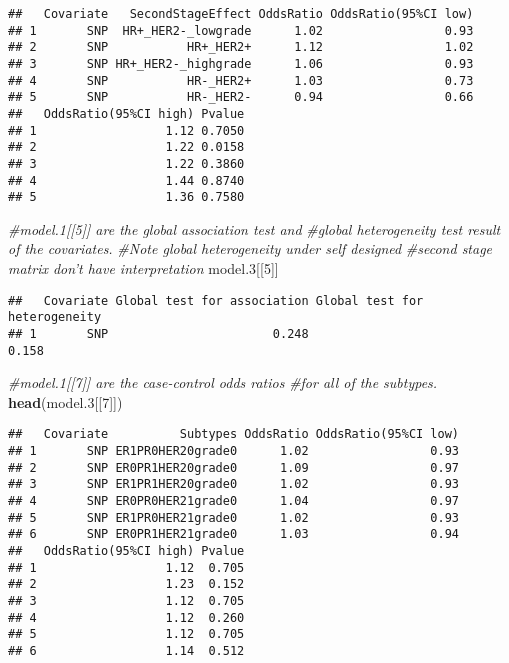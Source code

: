 \documentclass[11pt,]{article}
\newenvironment{Shaded}{\begin{snugshade}}{\end{snugshade}}
\newcommand{\CommentTok}[1]{\textcolor[rgb]{0.56,0.35,0.01}{\textit{#1}}}
\newcommand{\DecValTok}[1]{\textcolor[rgb]{0.00,0.00,0.81}{#1}}
\newcommand{\FloatTok}[1]{\textcolor[rgb]{0.00,0.00,0.81}{#1}}
\newcommand{\KeywordTok}[1]{\textcolor[rgb]{0.13,0.29,0.53}{\textbf{#1}}}
\newcommand{\NormalTok}[1]{#1}
\begin{document}
\begin{verbatim}
##   Covariate   SecondStageEffect OddsRatio OddsRatio(95%CI low)
## 1       SNP  HR+_HER2-_lowgrade      1.02                 0.93
## 2       SNP           HR+_HER2+      1.12                 1.02
## 3       SNP HR+_HER2-_highgrade      1.06                 0.93
## 4       SNP           HR-_HER2+      1.03                 0.73
## 5       SNP           HR-_HER2-      0.94                 0.66
##   OddsRatio(95%CI high) Pvalue
## 1                  1.12 0.7050
## 2                  1.22 0.0158
## 3                  1.22 0.3860
## 4                  1.44 0.8740
## 5                  1.36 0.7580
\end{verbatim}

\begin{Shaded}
\begin{Highlighting}[]
\CommentTok{#model.1[[5]] are the global association test and }
\CommentTok{#global heterogeneity test result of the covariates.}
\CommentTok{#Note global heterogeneity under self designed}
\CommentTok{#second stage matrix don't have interpretation}
\NormalTok{model}\FloatTok{.3}\NormalTok{[[}\DecValTok{5}\NormalTok{]]}
\end{Highlighting}
\end{Shaded}

\begin{verbatim}
##   Covariate Global test for association Global test for heterogeneity
## 1       SNP                       0.248                         0.158
\end{verbatim}

\begin{Shaded}
\begin{Highlighting}[]
\CommentTok{#model.1[[7]] are the case-control odds ratios }
\CommentTok{#for all of the subtypes.}
\KeywordTok{head}\NormalTok{(model}\FloatTok{.3}\NormalTok{[[}\DecValTok{7}\NormalTok{]])}
\end{Highlighting}
\end{Shaded}

\begin{verbatim}
##   Covariate          Subtypes OddsRatio OddsRatio(95%CI low)
## 1       SNP ER1PR0HER20grade0      1.02                 0.93
## 2       SNP ER0PR1HER20grade0      1.09                 0.97
## 3       SNP ER1PR1HER20grade0      1.02                 0.93
## 4       SNP ER0PR0HER21grade0      1.04                 0.97
## 5       SNP ER1PR0HER21grade0      1.02                 0.93
## 6       SNP ER0PR1HER21grade0      1.03                 0.94
##   OddsRatio(95%CI high) Pvalue
## 1                  1.12  0.705
## 2                  1.23  0.152
## 3                  1.12  0.705
## 4                  1.12  0.260
## 5                  1.12  0.705
## 6                  1.14  0.512
\end{verbatim}
\end{document}
